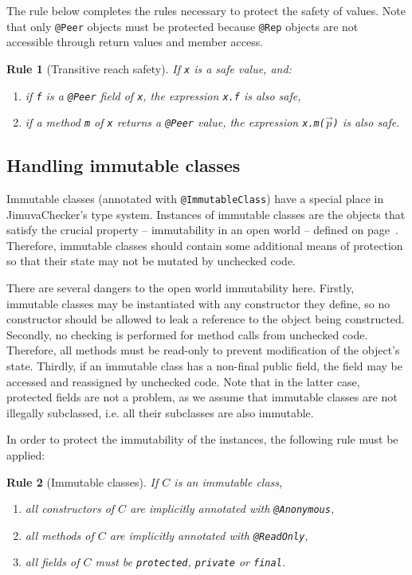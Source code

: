 \documentclass{pracamgr}
\theoremstyle{break}
\theoremstyle{break}
\theoremstyle{break}
\newtheorem{verrule}{Rule}
\begin{document}
The rule below completes the rules necessary to protect the safety of
values. Note that only \texttt{@Peer} objects must be protected
because \texttt{@Rep} objects are not accessible through return values
and member access.
\begin{verrule}[Transitive reach safety]
  If \texttt{x} is a safe value, and:
  \begin{enumerate}[label=(\arabic*)]
  \item if \texttt{f} is a \texttt{@Peer} field of \texttt{x}, the
    expression \texttt{x.f} is also safe, 
  \item if a method \texttt{m} of \texttt{x} returns a \texttt{@Peer}
    value, the expression \texttt{x.m($\vec{p}$)} is also safe. 
  \end{enumerate}
\end{verrule}

\subsection{Handling immutable classes}

Immutable classes (annotated with \texttt{@ImmutableClass}) have a
special place in JimuvaChecker's type system. Instances of immutable
classes are the objects that satisfy the crucial property --
immutability in an open world -- defined on
page~\pageref{inv:open}. Therefore, immutable classes should contain
some additional means of protection so that their state may not be
mutated by unchecked code.

There are several dangers to the open world immutability
here. Firstly, immutable classes may be instantiated with any
constructor they define, so no constructor should be allowed to leak a
reference to the object being constructed. Secondly, no checking is
performed for method calls from unchecked code. Therefore, all methods
must be read-only to prevent modification of the object's
state. Thirdly, if an immutable class has a non-final public field,
the field may be accessed and reassigned by unchecked code. Note that
in the latter case, protected fields are not a problem, as we assume
that immutable classes are not illegally subclassed, i.e. all their
subclasses are also immutable.

In order to protect the immutability of the instances, the following
rule must be applied:
\begin{verrule}[Immutable classes]
  If $C$ is an immutable class, 
  \begin{enumerate}[label=(\arabic*)]
  \item all constructors of $C$ are implicitly annotated with \texttt{@Anonymous},
  \item all methods of $C$ are implicitly annotated with \texttt{@ReadOnly},  
  \item all fields of $C$ must be \texttt{protected}, \texttt{private} or \texttt{final}.
  \end{enumerate}
\end{verrule}
\end{document}
